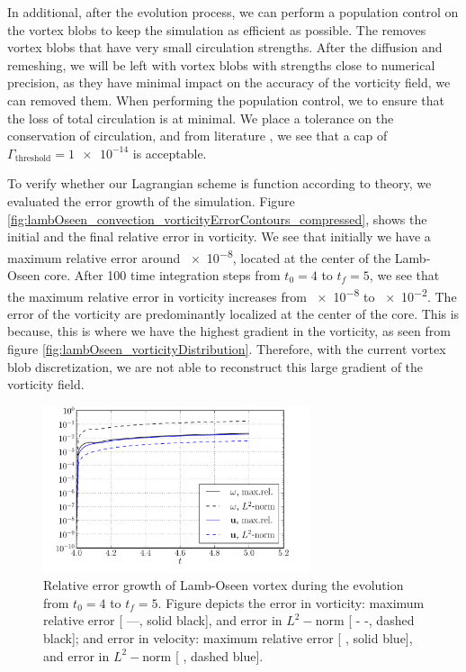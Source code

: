 In additional, after the evolution process, we can perform a population control on the vortex blobs to keep the simulation as efficient as possible. The  removes vortex blobs that have very small circulation strengths. After the diffusion and remeshing, we will be left with vortex blobs with strengths close to numerical precision, as they have minimal impact on the accuracy of the vorticity field, we can removed them. When performing the population control, we to ensure that the loss of total circulation is at minimal. We place a tolerance on the conservation of circulation, and from literature \cite{Barba2004c}, we see that a cap of $\Gamma_{\mathrm{threshold}}=\num{1e-14}$ is acceptable. 

To verify whether our Lagrangian scheme is function according to theory, we evaluated the error growth of the simulation. Figure \ref{fig:lambOseen_convection_vorticityErrorContours_compressed}, shows the initial and the final relative error in vorticity. We see that initially we have a maximum relative error around \num{e-8}, located at the center of the Lamb-Oseen core. After 100 time integration steps from $t_0=4$ to $t_f=5$, we see that the maximum relative error in vorticity increases from \num{e-8} to \num{e-2}. The error of the vorticity are predominantly localized at the center of the core. This is because, this is where we have the highest gradient in the vorticity, as seen from figure \ref{fig:lambOseen_vorticityDistribution}. Therefore, with the current vortex blob discretization, we are not able to reconstruct this large gradient of the vorticity field. 

	\begin{figure}[!t]
	\centering
	\includegraphics[width=0.7\textwidth]{figures/lagrangian/lambOseen_convection_errorGrowth_compressed.pdf}
	\caption{Relative error growth of Lamb-Oseen vortex during the evolution from $t_0=4$ to $t_f=5$. Figure depicts the error in vorticity: maximum relative error [ ---, solid black], and error in $L^2-\mathrm{norm}$ [ - -, dashed black]; and error in velocity: maximum relative error [ {\color{plotBlue}{---}}, solid blue], and error in $L^2-\mathrm{norm}$ [ {\color{plotBlue}{- -}}, dashed blue].}
	\label{fig:lambOseen_convection_errorGrowth_compressed}
	\end{figure}

